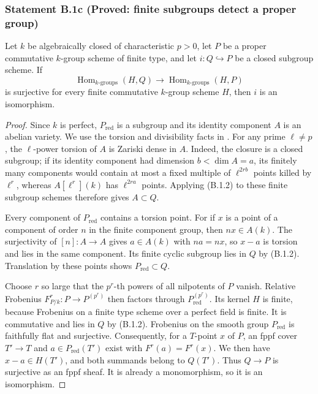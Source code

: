 \subsubsection*{Statement B.1c (Proved: finite subgroups detect a proper group)}
Let $k$ be algebraically closed of characteristic $p>0$, let $P$ be a
proper commutative $k$-group scheme of finite type, and let
$i:Q\hookrightarrow P$ be a closed subgroup scheme.  If
\[
 \operatorname{Hom}_{k\text{-groups}}(H,Q)
 \longrightarrow \operatorname{Hom}_{k\text{-groups}}(H,P)
 \tag{B.1.2}
\]
is surjective for every finite commutative $k$-group scheme $H$, then
$i$ is an isomorphism.
\begin{proof}
Since $k$ is perfect, $P_{\mathrm{red}}$ is a subgroup and its identity
component $A$ is an abelian variety.  We use the torsion and divisibility
facts in \cite[Proposition 39.9.11, Tag 03RP]{StacksB}.
For any prime $\ell\ne p$, the
$\ell$-power torsion of $A$ is Zariski dense in $A$.  Indeed, the closure
is a closed subgroup; if its identity component had dimension $b<
\dim A=a$, its finitely many components would contain at most a fixed
multiple of $\ell^{2rb}$ points killed by $\ell^r$, whereas
$A[\ell^r](k)$ has $\ell^{2ra}$ points.  Applying (B.1.2) to these
finite subgroup schemes therefore gives $A\subset Q$.

Every component of $P_{\mathrm{red}}$ contains a torsion point.  For
if $x$ is a point of a component of order $n$ in the finite component
group, then $nx\in A(k)$.  The surjectivity of $[n]:A\to A$ gives
$a\in A(k)$ with $na=nx$, so $x-a$ is torsion and lies in the same
component.  Its finite cyclic subgroup lies in $Q$ by (B.1.2).
Translation by these points shows $P_{\mathrm{red}}\subset Q$.

Choose $r$ so large that the $p^r$-th powers of all nilpotents of
$P$ vanish.  Relative Frobenius
$F^r_{P/k}:P\to P^{(p^r)}$ then factors through
$P_{\mathrm{red}}^{(p^r)}$.  Its kernel $H$ is finite, because
Frobenius on a finite type scheme over a perfect field is finite.
It is commutative and lies in $Q$ by (B.1.2).  Frobenius on the
smooth group $P_{\mathrm{red}}$ is faithfully flat and surjective.
Consequently, for a $T$-point $x$ of $P$, an fppf cover $T'\to T$
and $a\in P_{\mathrm{red}}(T')$ exist with
$F^r(a)=F^r(x)$.  We then have $x-a\in H(T')$, and both summands
belong to $Q(T')$.  Thus $Q\to P$ is surjective as an fppf sheaf.
It is already a monomorphism, so it is an isomorphism.
\end{proof}

